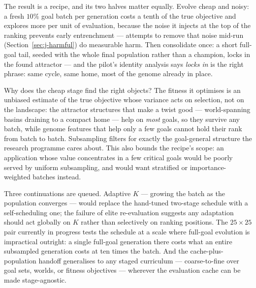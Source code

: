 \documentclass[a4paper, notitlepage, 11pt]{article}
\begin{document}
The result is a recipe, and its two halves matter equally.  Evolve cheap
and noisy: a fresh $10\%$ goal batch per generation costs a tenth of the
true objective and explores more per unit of evaluation, because the
noise it injects at the top of the ranking prevents early entrenchment
--- attempts to remove that noise mid-run (Section~\ref{sec:j-harmful})
do measurable harm.  Then consolidate once: a short full-goal tail,
seeded with the whole final population rather than a champion, locks in
the found attractor --- and the pilot's identity analysis says
\emph{locks in} is the right phrase: same cycle, same home, most of the
genome already in place.

Why does the cheap stage find the right objects?  The fitness it
optimises is an unbiased estimate of the true objective whose variance
acts on selection, not on the landscape: the attractor structures that
make a twist good --- world-spanning basins draining to a compact home
--- help on \emph{most} goals, so they survive any batch, while genome
features that help only a few goals cannot hold their rank from batch to
batch.  Subsampling filters for exactly the goal-general structure the
research programme cares about.  This also bounds the recipe's scope: an
application whose value concentrates in a few critical goals would be
poorly served by uniform subsampling, and would want stratified or
importance-weighted batches instead.

Three continuations are queued.  Adaptive $K$ --- growing the batch as
the population converges --- would replace the hand-tuned two-stage
schedule with a self-scheduling one; the failure of elite re-evaluation
suggests any adaptation should act globally on $K$ rather than
selectively on ranking positions.  The $25 \times 25$ pair currently in
progress tests the schedule at a scale where full-goal evolution is
impractical outright: a single full-goal generation there costs what an
entire subsampled generation costs at ten times the batch.  And the
cache-plus-population handoff generalises to any staged curriculum ---
coarse-to-fine over goal sets, worlds, or fitness objectives --- wherever
the evaluation cache can be made stage-agnostic.

\printbibliography
\end{document}
